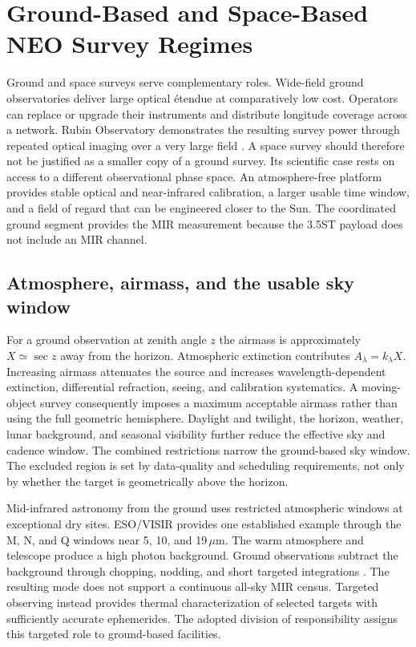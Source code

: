 \section{Ground-Based and Space-Based NEO Survey Regimes}
\label{sec:ground-space-surveys}

Ground and space surveys serve complementary roles. Wide-field ground
observatories deliver large optical étendue at comparatively low cost.
Operators can replace or upgrade their instruments and distribute longitude
coverage across a network. Rubin Observatory demonstrates the resulting
survey power through repeated optical imaging over a very large field
\cite{Ivezic2019}. A space survey should therefore not be justified as a
smaller copy of a ground survey. Its scientific case rests on access to a
different observational phase space. An atmosphere-free platform provides
stable optical and near-infrared calibration, a larger usable time window,
and a field of regard that can be engineered closer to the Sun. The
coordinated ground segment provides the MIR measurement because the 3.5ST
payload does not include an MIR channel.

\subsection{Atmosphere, airmass, and the usable sky window}

For a ground observation at zenith angle $z$ the airmass is approximately
$X\simeq\sec z$ away from the horizon. Atmospheric extinction contributes
$A_\lambda=k_\lambda X$. Increasing airmass attenuates the source and
increases wavelength-dependent extinction, differential refraction, seeing,
and calibration systematics. A moving-object survey consequently
imposes a maximum acceptable airmass rather than using the full geometric
hemisphere. Daylight and twilight, the horizon, weather, lunar background,
and seasonal visibility further reduce the effective sky and cadence window.
The combined restrictions narrow the ground-based sky window. The excluded
region is set by data-quality and scheduling requirements, not only by
whether the target is geometrically above the horizon.

Mid-infrared astronomy from the ground uses restricted atmospheric windows
at exceptional dry sites. ESO/VISIR provides one established example through
the M, N, and Q windows near 5, 10, and 19\,$\mu$m. The warm atmosphere and
telescope produce a high photon background. Ground observations subtract
the background through chopping, nodding, and short targeted integrations
\cite{ESOVISIR2019}. The resulting mode does not support a continuous
all-sky MIR census. Targeted observing instead provides thermal
characterization of selected targets with sufficiently accurate ephemerides.
The adopted division of
responsibility assigns this targeted role to ground-based facilities.

